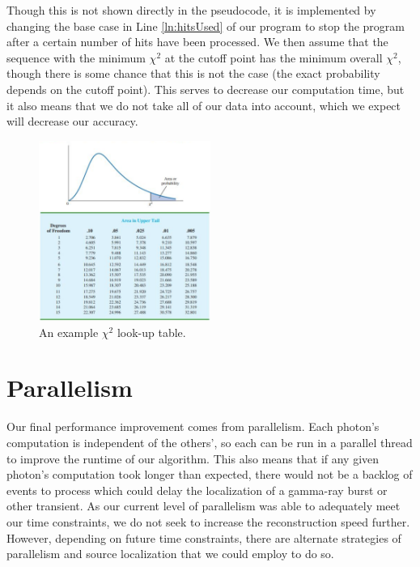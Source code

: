 \begin{enumerate}
    Though this is not shown directly in the pseudocode, it is implemented by changing the base case in Line \ref{ln:hitsUsed} of our program to stop the program after a certain number of hits have been processed. We then assume that the sequence with the minimum $\chi^2$ at the cutoff point has the minimum overall $\chi^2$, though there is some chance that this is not the case (the exact probability depends on the cutoff point). This serves to decrease our computation time, but it also means that we do not take all of our data into account, which we expect will decrease our accuracy.
\end{enumerate}

\begin{figure}
    \centering
    \includegraphics[width=0.5\textwidth]{chi2table.png}
    \caption{An example $\chi^2$ look-up table. \cite{chitable}}
    \label{fig:p-val}
\end{figure}

\section{Parallelism}
Our final performance improvement comes from parallelism. Each photon's computation is independent of the others', so each can be run in a parallel thread to improve the runtime of our algorithm. This also means that if any given photon's computation took longer than expected, there would not be a backlog of events to process which could delay the localization of a gamma-ray burst or other transient. As our current level of parallelism was able to adequately meet our time constraints, we do not seek to increase the reconstruction speed further. However, depending on future time constraints, there are alternate strategies of parallelism and source localization that we could employ to do so.